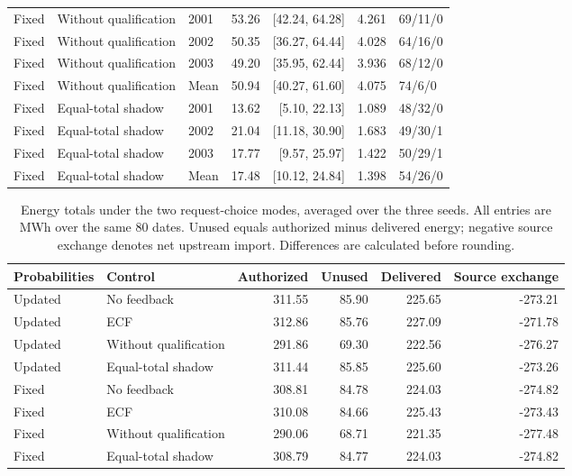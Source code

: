 \documentclass[11pt]{article}
\begin{document}
\begin{table}[!htbp]
\begin{tabular}{@{}lllrrrl@{}}
Fixed & Without qualification & 2001 & 53.26 & [42.24, 64.28] & 4.261 & 69/11/0 \\
Fixed & Without qualification & 2002 & 50.35 & [36.27, 64.44] & 4.028 & 64/16/0 \\
Fixed & Without qualification & 2003 & 49.20 & [35.95, 62.44] & 3.936 & 68/12/0 \\
Fixed & Without qualification & Mean & 50.94 & [40.27, 61.60] & 4.075 & 74/6/0 \\
Fixed & Equal-total shadow & 2001 & 13.62 & [5.10, 22.13] & 1.089 & 48/32/0 \\
Fixed & Equal-total shadow & 2002 & 21.04 & [11.18, 30.90] & 1.683 & 49/30/1 \\
Fixed & Equal-total shadow & 2003 & 17.77 & [9.57, 25.97] & 1.422 & 50/29/1 \\
Fixed & Equal-total shadow & Mean & 17.48 & [10.12, 24.84] & 1.398 & 54/26/0 \\
\bottomrule
\end{tabular}
\end{table}

\begin{table}[!htbp]
\centering
\caption{Energy totals under the two request-choice modes, averaged over the three seeds. All entries are MWh over the same 80 dates. Unused equals authorized minus delivered energy; negative source exchange denotes net upstream import. Differences are calculated before rounding.}
\label{tab:supp_adapt_energy}
\small
\begin{tabular}{@{}llrrrr@{}}
\toprule
Probabilities & Control & Authorized & Unused & Delivered & Source exchange \\
\midrule
Updated & No feedback & 311.55 & 85.90 & 225.65 & -273.21 \\
Updated & ECF & 312.86 & 85.76 & 227.09 & -271.78 \\
Updated & Without qualification & 291.86 & 69.30 & 222.56 & -276.27 \\
Updated & Equal-total shadow & 311.44 & 85.85 & 225.60 & -273.26 \\
Fixed & No feedback & 308.81 & 84.78 & 224.03 & -274.82 \\
Fixed & ECF & 310.08 & 84.66 & 225.43 & -273.43 \\
Fixed & Without qualification & 290.06 & 68.71 & 221.35 & -277.48 \\
Fixed & Equal-total shadow & 308.79 & 84.77 & 224.03 & -274.82 \\
\bottomrule
\end{tabular}
\end{table}
\end{document}
